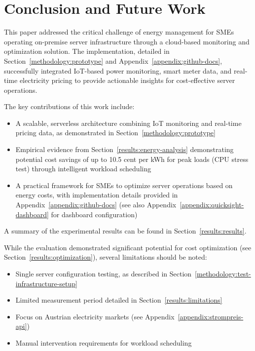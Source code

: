 


\section{Conclusion and Future Work}
\label{conclusion:conclusion}
This paper addressed the critical challenge of energy management for SMEs operating on-premise server infrastructure through a cloud-based monitoring and optimization solution. The implementation, detailed in Section~\ref{methodology:prototype} and Appendix~\ref{appendix:github-docs}, successfully integrated IoT-based power monitoring, smart meter data, and real-time electricity pricing to provide actionable insights for cost-effective server operations.

The key contributions of this work include:
\begin{itemize}
    \item A scalable, serverless architecture combining IoT monitoring and real-time pricing data,
    as demonstrated in Section~\ref{methodology:prototype}
    \item Empirical evidence from Section~\ref{results:energy-analysis} demonstrating 
    potential cost savings of up to 10.5 cent per kWh for peak loads (CPU stress test) through intelligent workload scheduling
    \item A practical framework for SMEs to optimize server operations based on energy costs, with implementation details provided in Appendix~\ref{appendix:github-docs} (see also Appendix~\ref{appendix:quicksight-dashboard} for dashboard configuration)
\end{itemize}

A summary of the experimental results can be found in Section~\ref{results:results}.

While the evaluation demonstrated significant potential for cost optimization (see Section~\ref{results:optimization}), several limitations should be noted:
\begin{itemize}
    \item Single server configuration testing, as described in Section~\ref{methodology:test-infrastructure-setup}
    \item Limited measurement period detailed in Section~\ref{results:limitations}
    \item Focus on Austrian electricity markets (see Appendix~\ref{appendix:strompreis-api})
    \item Manual intervention requirements for workload scheduling
\end{itemize}

